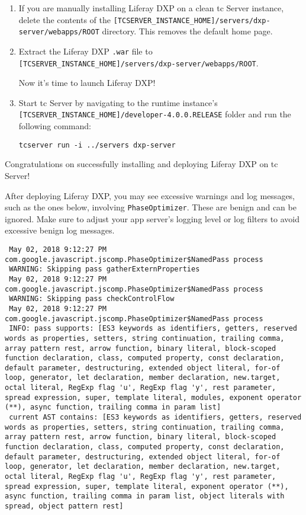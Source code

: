 \begin{enumerate}
\def\labelenumi{\arabic{enumi}.}
\item
  If you are manually installing Liferay DXP on a clean tc Server
  instance, delete the contents of the
  \texttt{{[}TCSERVER\_INSTANCE\_HOME{]}/servers/dxp-server/webapps/ROOT}
  directory. This removes the default home page.
\item
  Extract the Liferay DXP \texttt{.war} file to
  \texttt{{[}TCSERVER\_INSTANCE\_HOME{]}/servers/dxp-server/webapps/ROOT}.

  Now it's time to launch Liferay DXP!
\item
  Start tc Server by navigating to the runtime instance's
  \texttt{{[}TCSERVER\_INSTANCE\_HOME{]}/developer-4.0.0.RELEASE} folder
  and run the following command:

\begin{verbatim}
tcserver run -i ../servers dxp-server
\end{verbatim}
\end{enumerate}

Congratulations on successfully installing and deploying Liferay DXP on
tc Server!

\noindent\hrulefill

After deploying Liferay DXP, you may see excessive warnings and log
messages, such as the ones below, involving \texttt{PhaseOptimizer}.
These are benign and can be ignored. Make sure to adjust your app
server's logging level or log filters to avoid excessive benign log
messages.

\begin{verbatim}
 May 02, 2018 9:12:27 PM com.google.javascript.jscomp.PhaseOptimizer$NamedPass process
 WARNING: Skipping pass gatherExternProperties
 May 02, 2018 9:12:27 PM com.google.javascript.jscomp.PhaseOptimizer$NamedPass process
 WARNING: Skipping pass checkControlFlow
 May 02, 2018 9:12:27 PM com.google.javascript.jscomp.PhaseOptimizer$NamedPass process
 INFO: pass supports: [ES3 keywords as identifiers, getters, reserved words as properties, setters, string continuation, trailing comma, array pattern rest, arrow function, binary literal, block-scoped function declaration, class, computed property, const declaration, default parameter, destructuring, extended object literal, for-of loop, generator, let declaration, member declaration, new.target, octal literal, RegExp flag 'u', RegExp flag 'y', rest parameter, spread expression, super, template literal, modules, exponent operator (**), async function, trailing comma in param list]
 current AST contains: [ES3 keywords as identifiers, getters, reserved words as properties, setters, string continuation, trailing comma, array pattern rest, arrow function, binary literal, block-scoped function declaration, class, computed property, const declaration, default parameter, destructuring, extended object literal, for-of loop, generator, let declaration, member declaration, new.target, octal literal, RegExp flag 'u', RegExp flag 'y', rest parameter, spread expression, super, template literal, exponent operator (**), async function, trailing comma in param list, object literals with spread, object pattern rest]
\end{verbatim}

